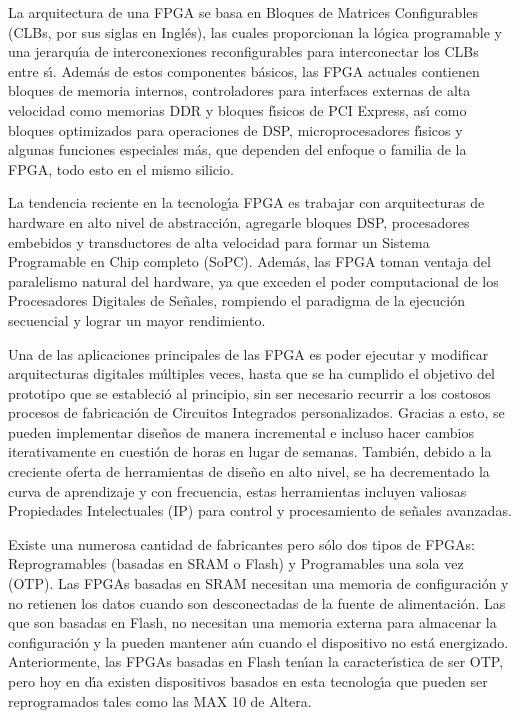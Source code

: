 La arquitectura de una FPGA se basa en Bloques de Matrices Configurables
(CLBs, por sus siglas en Ingl\'{e}s), las cuales proporcionan la l\'{o}gica
programable y una jerarqu\'{\i}a de interconexiones reconfigurables
para interconectar los CLBs entre s\'{\i}. Adem\'{a}s de estos componentes
b\'{a}sicos, las FPGA actuales contienen bloques de memoria internos,
controladores para interfaces externas de alta velocidad como memorias
DDR y bloques f\'{\i}sicos de PCI Express, as\'{\i} como bloques optimizados
para operaciones de DSP, microprocesadores f\'{\i}sicos y algunas
funciones especiales m\'{a}s, que dependen del enfoque o familia de
la FPGA, todo esto en el mismo silicio.

La tendencia reciente en la tecnolog\'{\i}a FPGA es trabajar con arquitecturas
de hardware en alto nivel de abstracci\'{o}n, agregarle bloques DSP,
procesadores embebidos y transductores de alta velocidad para formar
un Sistema Programable en Chip completo (SoPC). Adem\'{a}s, las FPGA
toman ventaja del paralelismo natural del hardware, ya que exceden
el poder computacional de los Procesadores Digitales de Se\~{n}ales,
rompiendo el paradigma de la ejecuci\'{o}n secuencial y lograr un
mayor rendimiento.

Una de las aplicaciones principales de las FPGA es poder ejecutar
y modificar arquitecturas digitales m\'{u}ltiples veces, hasta que
se ha cumplido el objetivo del prototipo que se estableci\'{o} al
principio, sin ser necesario recurrir a los costosos procesos de fabricaci\'{o}n
de Circuitos Integrados personalizados. Gracias a esto, se pueden
implementar dise\~{n}os de manera incremental e incluso hacer cambios
iterativamente en cuesti\'{o}n de horas en lugar de semanas. Tambi\'{e}n,
debido a la creciente oferta de herramientas de dise\~{n}o en alto
nivel, se ha decrementado la curva de aprendizaje y con frecuencia,
estas herramientas incluyen valiosas Propiedades Intelectuales (IP)
para control y procesamiento de se\~{n}ales avanzadas.

Existe una numerosa cantidad de fabricantes pero s\'{o}lo dos tipos
de FPGAs: Reprogramables (basadas en SRAM o Flash) y Programables
una sola vez (OTP). Las FPGAs basadas en SRAM necesitan una memoria
de configuraci\'{o}n y no retienen los datos cuando son desconectadas
de la fuente de alimentaci\'{o}n. Las que son basadas en Flash, no
necesitan una memoria externa para almacenar la configuraci\'{o}n
y la pueden mantener a\'{u}n cuando el dispositivo no est\'{a} energizado.
Anteriormente, las FPGAs basadas en Flash ten\'{\i}an la caracter\'{\i}stica
de ser OTP, pero hoy en d\'{\i}a existen dispositivos basados en esta
tecnolog\'{\i}a que pueden ser reprogramados tales como las MAX 10
de Altera.

